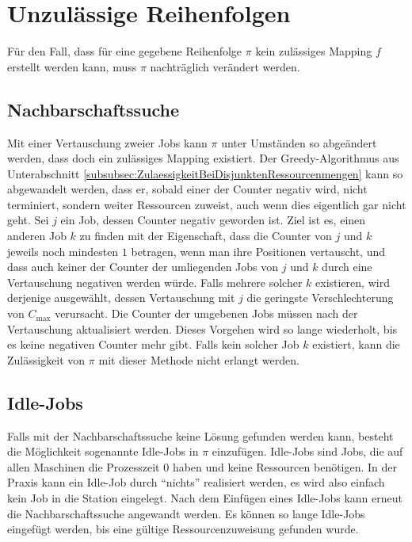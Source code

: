 \documentclass{scrreprt}
\begin{document}
\section{Unzulässige Reihenfolgen}
\label{UnzulaessigeReihenfolgen}
Für den Fall, dass für eine gegebene Reihenfolge $\pi$ kein zulässiges Mapping $f$ erstellt werden kann, muss $\pi$ nachträglich verändert werden.

\subsection{Nachbarschaftssuche}
Mit einer Vertauschung zweier Jobs kann $\pi$ unter Umständen so abgeändert werden, dass doch ein zulässiges Mapping existiert.
Der Greedy-Algorithmus aus Unterabschnitt \ref{subsubsec:ZulaessigkeitBeiDisjunktenRessourcenmengen} kann so abgewandelt werden,
dass er, sobald einer der Counter negativ wird, nicht terminiert, sondern weiter Ressourcen zuweist, auch wenn dies eigentlich gar nicht geht.
Sei $j$ ein Job, dessen Counter negativ geworden ist.
Ziel ist es, einen anderen Job $k$ zu finden mit der Eigenschaft, dass die Counter von $j$ und $k$ jeweils noch mindesten $1$ betragen, wenn man ihre Positionen vertauscht,
und dass auch keiner der Counter der umliegenden Jobs von $j$ und $k$ durch eine Vertauschung negativen werden würde.
Falls mehrere solcher $k$ existieren, wird derjenige ausgewählt, dessen Vertauschung mit $j$ die geringste Verschlechterung von $C_{\max}$ verursacht.
Die Counter der umgebenen Jobs müssen nach der Vertauschung aktualisiert werden.
Dieses Vorgehen wird so lange wiederholt, bis es keine negativen Counter mehr gibt.
Falls kein solcher Job $k$ existiert, kann die Zulässigkeit von $\pi$ mit dieser Methode nicht erlangt werden.


\subsection{Idle-Jobs}
Falls mit der Nachbarschaftssuche keine Lösung gefunden werden kann, besteht die Möglichkeit sogenannte Idle-Jobs in $\pi$ einzufügen.
Idle-Jobs sind Jobs, die auf allen Maschinen die Prozesszeit $0$ haben und keine Ressourcen benötigen.
In der Praxis kann ein Idle-Job durch "`nichts"' realisiert werden, es wird also einfach kein Job in die Station eingelegt.
Nach dem Einfügen eines Idle-Jobs kann erneut die Nachbarschaftssuche angewandt werden.
Es können so lange Idle-Jobs eingefügt werden, bis eine gültige Ressourcenzuweisung gefunden wurde.
\end{document}
